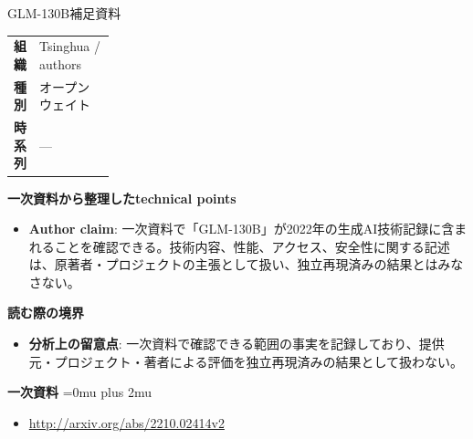 \begin{technicalnote}{GLM-130B}{補足資料}
\begingroup
\begin{tabularx}{\linewidth}{@{}>{\bfseries}p{0.22\linewidth}X@{}}
組織 & Tsinghua / authors \\
種別 & オープンウェイト \\
時系列 & — \\
\end{tabularx}
\smallskip
{\bfseries 一次資料から整理したtechnical points}
\begin{itemize}[leftmargin=1.5em,itemsep=0.35em]
\item \textbf{Author claim}: 一次資料で「GLM-130B」が2022年の生成AI技術記録に含まれることを確認できる。技術内容、性能、アクセス、安全性に関する記述は、原著者・プロジェクトの主張として扱い、独立再現済みの結果とはみなさない。
\end{itemize}
\begin{minipage}{\linewidth}
{\bfseries 読む際の境界}
\begin{itemize}[leftmargin=1.5em,itemsep=0.35em]
\item \textbf{分析上の留意点}: 一次資料で確認できる範囲の事実を記録しており、提供元・プロジェクト・著者による評価を独立再現済みの結果として扱わない。
\end{itemize}
\begin{samepage}
{\bfseries 一次資料}
\begingroup\sloppy
\Urlmuskip=0mu plus 2mu\relax
\begin{itemize}[leftmargin=1.5em,itemsep=0.25em]
\item {\scriptsize\url{http://arxiv.org/abs/2210.02414v2}}
\end{itemize}
\endgroup
\end{samepage}
\end{minipage}
\endgroup
\end{technicalnote}
\medskip
